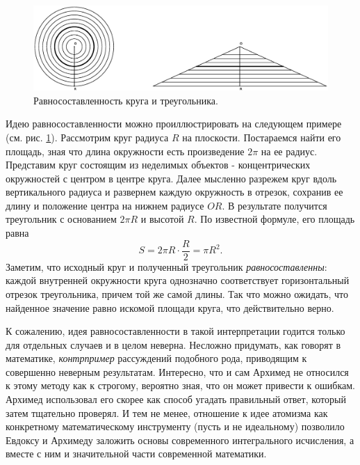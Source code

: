 \begin{figure}[t]
   \centering
   \includegraphics[scale=0.44]{images/archimed_1}
   \caption{Равносоставленность круга и треугольника.}
   \label{fig:archimed_1}
\end{figure}

Идею равносоставленности можно проиллюстрировать на следующем примере (см. рис. \ref{fig:archimed_1}).
Рассмотрим круг радиуса $R$ на плоскости.
Постараемся найти его площадь, зная что длина окружности есть произведение $2\pi$ на ее радиус.
Представим круг состоящим из неделимых объектов - концентрических окружностей с центром в центре круга.
Далее мысленно разрежем круг вдоль вертикального радиуса и развернем каждую окружность в отрезок, сохранив ее длину и положение центра на нижнем радиусе $OR$.
В результате получится треугольник с основанием $2\pi R$ и высотой $R$.
По известной формуле, его площадь равна
$$
S = 2\pi R\cdot\frac{R}{2} = \pi R^2.
$$
Заметим, что исходный круг и полученный треугольник \textit{равносоставленны}: каждой внутренней окружности круга однозначно соответствует горизонтальный отрезок треугольника, причем той же самой длины.
Так что можно ожидать, что найденное значение равно искомой площади круга, что действительно верно.

К сожалению, идея равносоставленности в такой интерпретации годится только для отдельных случаев и в целом неверна. 
Несложно придумать, как говорят в математике, \textit{контрпример} рассуждений подобного рода, приводящим к совершенно неверным результатам.
Интересно, что и сам Архимед не относился к этому методу как к строгому, вероятно зная, что он может привести к ошибкам.
Архимед использовал его скорее как способ угадать правильный ответ, который затем тщательно проверял. 
И тем не менее, отношение к идее атомизма как конкретному математическому инструменту (пусть и не идеальному) позволило Евдоксу и Архимеду заложить основы современного интегрального исчисления, а вместе с ним и значительной части современной математики.

